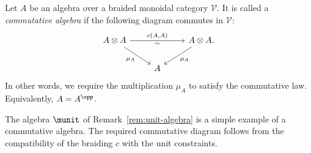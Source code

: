 \begin{definition}\label{def:calg-monoidal}
	Let $A$ be an algebra over a braided monoidal category $\mathcal{V}$. It
	is called a \emph{commutative algebra} if the following diagram commutes
	in $\mathcal{V}$:
	\[\begin{tikzcd}
		A \otimes A \arrow[rd, "{\mu_A}"'] \arrow[rr, "{c(A, A)}", "\sim"'] & & A \otimes A . \arrow[ld, "{\mu_A}"] \\
		& A &
	\end{tikzcd}\]
	In other words, we require the multiplication $\mu_A$ to satisfy the
	commutative law. Equivalently, $A=A^{\opp}$.
\end{definition}

The algebra $\munit$ of Remark~\ref{rem:unit-algebra} is a simple example of a
commutative algebra. The required commutative diagram follows from the
compatibility of the braiding $c$ with the unit constraints.

